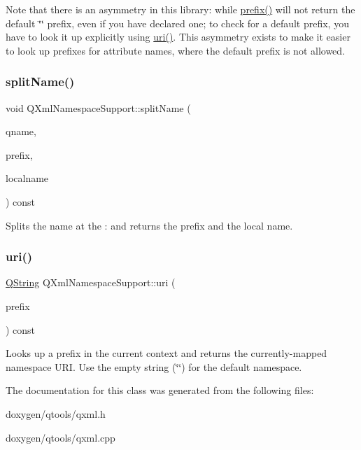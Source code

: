 Note that there is an asymmetry in this library\+: while \mbox{\hyperlink{class_q_xml_namespace_support_a3799ab420cf2a762eb74929fdf5707e5}{prefix()}} will not return the default \char`\"{}\char`\"{} prefix, even if you have declared one; to check for a default prefix, you have to look it up explicitly using \mbox{\hyperlink{class_q_xml_namespace_support_a6c16aac98314cd385f6442308482ce1b}{uri()}}. This asymmetry exists to make it easier to look up prefixes for attribute names, where the default prefix is not allowed. \mbox{\label{class_q_xml_namespace_support_a6084f67775d7760c596495bd4ad0536d}} 
\subsubsection{\texorpdfstring{splitName()}{splitName()}}
{\footnotesize\ttfamily void Q\+Xml\+Namespace\+Support\+::split\+Name (\begin{DoxyParamCaption}\item[{const \mbox{\hyperlink{class_q_string}{Q\+String}} \&}]{qname,  }\item[{\mbox{\hyperlink{class_q_string}{Q\+String}} \&}]{prefix,  }\item[{\mbox{\hyperlink{class_q_string}{Q\+String}} \&}]{localname }\end{DoxyParamCaption}) const}

Splits the name at the \textquotesingle{}\+:\textquotesingle{} and returns the prefix and the local name. \mbox{\label{class_q_xml_namespace_support_a6c16aac98314cd385f6442308482ce1b}} 
\subsubsection{\texorpdfstring{uri()}{uri()}}
{\footnotesize\ttfamily \mbox{\hyperlink{class_q_string}{Q\+String}} Q\+Xml\+Namespace\+Support\+::uri (\begin{DoxyParamCaption}\item[{const \mbox{\hyperlink{class_q_string}{Q\+String}} \&}]{prefix }\end{DoxyParamCaption}) const}

Looks up a prefix in the current context and returns the currently-\/mapped namespace U\+RI. Use the empty string (\char`\"{}\char`\"{}) for the default namespace. 

The documentation for this class was generated from the following files\+:\begin{DoxyCompactItemize}
\item 
doxygen/qtools/qxml.\+h\item 
doxygen/qtools/qxml.\+cpp\end{DoxyCompactItemize}
